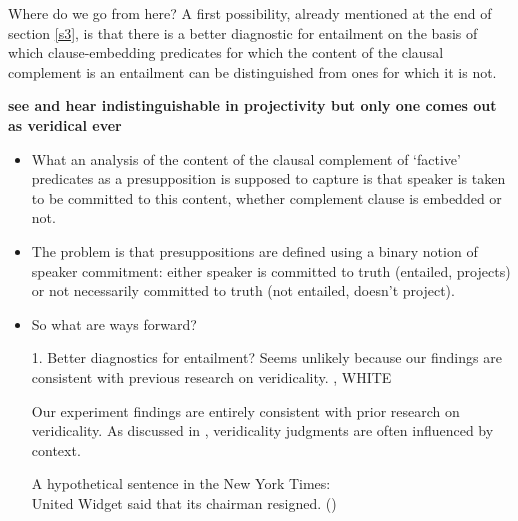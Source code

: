 \documentclass[11pt,fleqn]{article}
\newcommand{\6}{\mbox{$[\hspace*{-.6mm}[$}}
\newcommand{\9}{\mbox{$]\hspace*{-.6mm}]$}}
\begin{document}
{Where do we go from here? A first possibility, already mentioned at the end of section \ref{s3}, is that there is a better diagnostic for entailment on the basis of which clause-embedding predicates for which the content of the clausal complement is an entailment can be distinguished from ones for which it is not. 


{\bf see and hear indistinguishable in projectivity but only one comes out as veridical ever}



\begin{itemize}

\item What an analysis of the content of the clausal complement of `factive' predicates as a presupposition is supposed to capture is that speaker is taken to be committed to this content, whether complement clause is embedded or not. 

\item The problem is that presuppositions are defined using a binary notion of speaker commitment: either speaker is committed to truth (entailed, projects) or not necessarily committed to truth (not entailed, doesn't project).

\item So what are ways forward? 

1. Better diagnostics for entailment? Seems unlikely because our findings are consistent with previous research on veridicality. \citealt{demarneffe-etal2012}, WHITE

Our experiment findings are entirely consistent with prior research on veridicality. As discussed in \citealt{demarneffe-etal2012}, veridicality judgments are often influenced by context. 

\begin{exe}
\ex A hypothetical sentence in the New York Times: \\ United Widget said that its chairman resigned. \hfill (\citealt[302]{demarneffe-etal2012})
\end{exe}


\end{itemize}}
\end{document}
